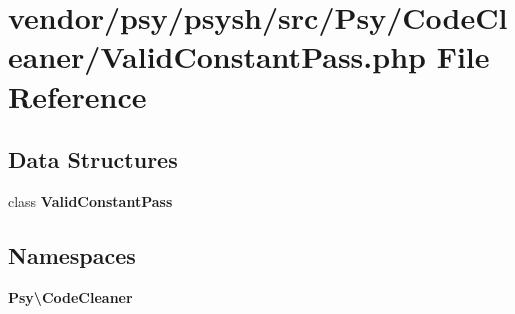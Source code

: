 \section{vendor/psy/psysh/src/\+Psy/\+Code\+Cleaner/\+Valid\+Constant\+Pass.php File Reference}
\label{_valid_constant_pass_8php}
\subsection*{Data Structures}
\begin{DoxyCompactItemize}
\item 
class {\bf Valid\+Constant\+Pass}
\end{DoxyCompactItemize}
\subsection*{Namespaces}
\begin{DoxyCompactItemize}
\item 
 {\bf Psy\textbackslash{}\+Code\+Cleaner}
\end{DoxyCompactItemize}
